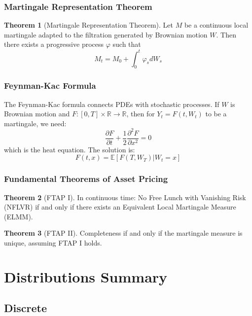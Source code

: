 \documentclass[11pt,a4paper]{article}
\theoremstyle{definition}
\newtheorem{theorem}{Theorem}[section]
\begin{document}
\subsubsection{Martingale Representation Theorem}

\begin{theorem}[Martingale Representation Theorem]\label{thm:mrt}
Let $M$ be a continuous local martingale adapted to the filtration generated by Brownian motion $W$. Then there exists a progressive process $\varphi$ such that
\[
M_t = M_0 + \int_0^t \varphi_s dW_s
\]
\end{theorem}

\subsubsection{Feynman-Kac Formula}

The Feynman-Kac formula connects PDEs with stochastic processes. If $W$ is Brownian motion and $F: [0,T] \times \mathbb{R} \to \mathbb{R}$, then for $Y_t = F(t, W_t)$ to be a martingale, we need:
\[
\frac{\partial F}{\partial t} + \frac{1}{2} \frac{\partial^2 F}{\partial x^2} = 0
\]
which is the heat equation. The solution is:
\[
F(t,x) = \mathbb{E}[F(T, W_T) | W_t = x]
\]

\subsubsection{Fundamental Theorems of Asset Pricing}

\begin{theorem}[FTAP I]\label{thm:ftap1}
In continuous time: No Free Lunch with Vanishing Risk (NFLVR) if and only if there exists an Equivalent Local Martingale Measure (ELMM).
\end{theorem}

\begin{theorem}[FTAP II]\label{thm:ftap2}
Completeness if and only if the martingale measure is unique, assuming FTAP I holds.
\end{theorem}


\newpage




\renewcommand{\arraystretch}{1.4}

\section{Distributions Summary}
\subsection{Discrete}
\end{document}
